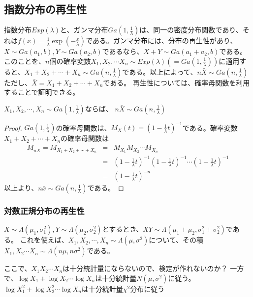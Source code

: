\subsection{指数分布の再生性}
指数分布$Exp(\lambda)$と、ガンマ分布$Ga(1,\frac{1}{\lambda})$は、同一の密度分布関数であり、それは$f(x) = \frac{1}{\lambda} \exp(-\frac{x}{\lambda})$である。ガンマ分布には、分布の再生性があり、$X\sim Ga(a_1,b),Y\sim Ga(a_2,b)$であるなら、$X+Y \sim Ga(a_1+a_2,b)$である。このことを、$n$個の確率変数$X_1,X_2,\cdots X_n \sim Exp(\lambda)(=Ga(1,\frac{1}{\lambda}) )$に適用すると、$X_1+X_2+\cdots+X_n \sim Ga(n,\frac{1}{\lambda})$である。以上によって、$n\bar{X}\sim Ga(n,\frac{1}{\lambda})$ただし、$\bar{X}=X_1+X_2+\cdots+X_n$である。
再生性については、確率母関数を利用することで証明できる。

\begin{theo}
    $X_1,X_2,\cdots,X_n \sim Ga(1,\frac{1}{\lambda})$ならば、
    $n\bar{X}\sim Ga(n,\frac{1}{\lambda})$
\end{theo}

\begin{proof}
    $Ga(1,\frac{1}{\lambda})$の確率母関数は、$M_X(t)=(1-\frac{1}{\lambda}t)^{-1}$である。確率変数$X_1+X_2+\cdots+X_n$の確率母関数は
    \begin{eqnarray}
        M_{n\bar{X}} = M_{X_1+X_2+\cdots+X_n} &=& M_{X_1}M_{X_2}\cdots M_{X_n} \\
        &=& (1-\frac{1}{\lambda}t)^{-1}(1-\frac{1}{\lambda}t)^{-1}\cdots(1-\frac{1}{\lambda}t)^{-1}\\
        &=& (1-\frac{1}{\lambda}t)^{-n}
    \end{eqnarray}
    以上より、$n\bar{x}\sim Ga(n,\frac{1}{\lambda})$である。
\end{proof}

\subsubsection{対数正規分布の再生性}
$X\sim \Lambda(\mu_1,\sigma_1^2), Y\sim \Lambda(\mu_2,\sigma^2_2)$とするとき、$XY\sim\Lambda(\mu_1+\mu_2,\sigma_1^2+\sigma_2^2)$である。
これを使えば、$X_1,X_2,\cdots,X_n \sim \Lambda(\mu,\sigma^2)$について、その積$X_1,X_2\cdots X_n \sim \Lambda(n\mu,n\sigma^2)$である。

ここで、$X_1X_2\cdots X_n$は十分統計量にならないので、検定が作れないのか？
一方で、$\log X_1+\log X_2 \cdots \log X_n $は十分統計量$N(\mu,\sigma^2)$に従う。
$\log X_1^2+\log X_2^2 \cdots \log X_n $は十分統計量$\chi^2$分布に従う
\fi




